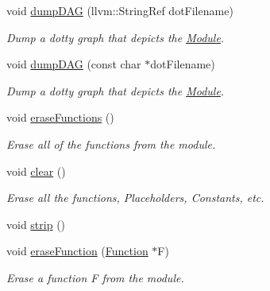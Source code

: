 \begin{DoxyCompactItemize}
\mbox{\label{classglow_1_1_module_a721b389cf6c97e09f0a9e61289b1db47}} 
void \hyperlink{classglow_1_1_module_a721b389cf6c97e09f0a9e61289b1db47}{dump\+D\+AG} (llvm\+::\+String\+Ref dot\+Filename)
\begin{DoxyCompactList}\small\item\em Dump a dotty graph that depicts the \hyperlink{classglow_1_1_module}{Module}. \end{DoxyCompactList}\item 
\mbox{\label{classglow_1_1_module_a1182912a52f423851ac1c23f05e42be5}} 
void \hyperlink{classglow_1_1_module_a1182912a52f423851ac1c23f05e42be5}{dump\+D\+AG} (const char $\ast$dot\+Filename)
\begin{DoxyCompactList}\small\item\em Dump a dotty graph that depicts the \hyperlink{classglow_1_1_module}{Module}. \end{DoxyCompactList}\item 
\mbox{\label{classglow_1_1_module_a331945be92fc828bc4835383d5ca0b4d}} 
void \hyperlink{classglow_1_1_module_a331945be92fc828bc4835383d5ca0b4d}{erase\+Functions} ()
\begin{DoxyCompactList}\small\item\em Erase all of the functions from the module. \end{DoxyCompactList}\item 
\mbox{\label{classglow_1_1_module_a2f39d2ca239d90ddbfc667a8f59ba1f7}} 
void \hyperlink{classglow_1_1_module_a2f39d2ca239d90ddbfc667a8f59ba1f7}{clear} ()
\begin{DoxyCompactList}\small\item\em Erase all the functions, Placeholders, Constants, etc. \end{DoxyCompactList}\item 
void \hyperlink{classglow_1_1_module_a6b31e53e57587b15d32b32c6a0db5c05}{strip} ()
\item 
\mbox{\label{classglow_1_1_module_a7411ee6e80c5440fdcb9933ac578842b}} 
void \hyperlink{classglow_1_1_module_a7411ee6e80c5440fdcb9933ac578842b}{erase\+Function} (\hyperlink{classglow_1_1_function}{Function} $\ast$F)
\begin{DoxyCompactList}\small\item\em Erase a function {\ttfamily F} from the module. \end{DoxyCompactList}\item 

\end{DoxyCompactItemize}
